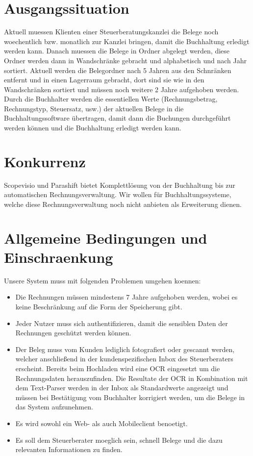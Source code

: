 \documentclass[12pt]{article}
\theoremstyle{definition}
\begin{document}
\section{Ausgangssituation}
Aktuell muessen Klienten einer Steuerberatungskanzlei die Belege noch woechentlich bzw. monatlich zur Kanzlei bringen, damit die Buchhaltung erledigt werden kann. Danach muessen die Belege in Ordner abgelegt werden, diese Ordner werden dann in Wandschränke gebracht und alphabetisch und nach Jahr sortiert. Aktuell werden die Belegordner nach 5 Jahren aus den Schnränken entfernt und in einen Lagerraum gebracht, dort sind sie wie in den Wandschränken sortiert und müssen noch weitere 2 Jahre aufgehoben werden. Durch die Buchhalter werden die essentiellen Werte (Rechnungsbetrag, Rechnungstyp, Steuersatz, usw.) der aktuellen Belege in die Buchhaltungssoftware übertragen, damit dann die Buchungen durchgeführt werden können und die Buchhaltung erledigt werden kann.
\pagebreak

\section{Konkurrenz}
Scopevisio und Parashift bietet Komplettlösung von der Buchhaltung bis zur automatischen Rechnungsverwaltung. Wir wollen für Buchhaltungssysteme, welche diese Rechnungsverwaltung noch nicht anbieten als Erweiterung dienen.
\pagebreak

\section{Allgemeine Bedingungen und Einschraenkung}

Unsere System muss mit folgenden Problemen umgehen koennen:
\begin{itemize}
\item Die Rechnungen müssen mindestens 7 Jahre aufgehoben werden, wobei es keine Beschränkung auf die Form der Speicherung gibt.
\item Jeder Nutzer muss sich authentifizieren, damit die sensiblen Daten der Rechnungen geschützt werden können.
\item Der Beleg muss vom Kunden lediglich fotografiert oder gescannt werden, welcher anschließend in der kundenspezifischen Inbox des Steuerberaters erscheint. Bereits beim Hochladen wird eine OCR eingesetzt um die Rechnungsdaten herauszufinden. Die Resultate der OCR in Kombination mit dem Text-Parser werden in der Inbox als Standardwerte angezeigt und müssen bei Bestätigung vom Buchhalter korrigiert werden, um die Belege in das System aufzunehmen.
\item Es wird sowohl ein Web- als auch Mobileclient benoetigt.
\item Es soll dem Steuerberater moeglich sein, schnell Belege und die dazu relevanten Informationen zu finden.
\end{itemize}
\end{document}
